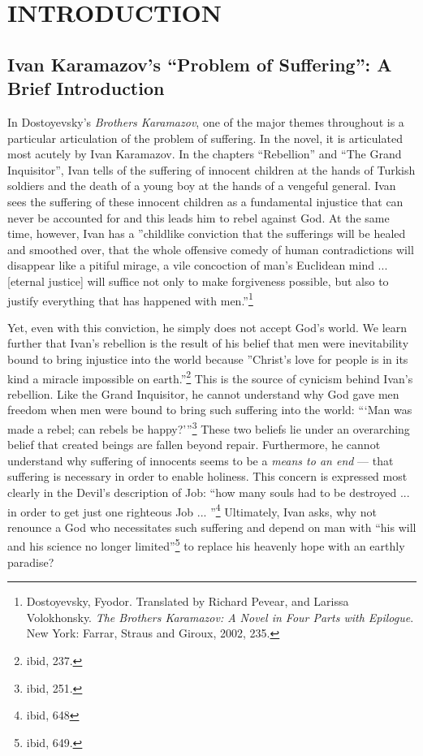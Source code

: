 \tableofcontents
\chapter{INTRODUCTION}

\pagestyle{myheadings}

\label{introduction}
\section{Ivan Karamazov's ``Problem of Suffering'': A Brief Introduction}
In Dostoyevsky's \emph{Brothers Karamazov}, one of the major themes throughout is a particular articulation of the problem of suffering. In the novel, it is articulated most acutely by Ivan Karamazov. In the chapters ``Rebellion'' and ``The Grand Inquisitor'', Ivan tells of the suffering of innocent children at the hands of Turkish soldiers and the death of a young boy at the hands of a vengeful general. Ivan sees the suffering of these innocent children as a fundamental injustice that can never be accounted for and this leads him to rebel against God. At the same time, however, Ivan has a ''childlike conviction that the sufferings will be healed and smoothed over, that the whole offensive comedy of human contradictions will disappear like a pitiful mirage, a vile concoction of man's Euclidean mind ... [eternal justice] will suffice not only to make forgiveness possible, but also to justify everything that has happened with men.''\footnote{Dostoyevsky, Fyodor. Translated by Richard Pevear, and Larissa Volokhonsky. \emph{The Brothers Karamazov: A Novel in Four Parts with Epilogue}. New York: Farrar, Straus and Giroux, 2002, 235.}

Yet, even with this conviction, he simply does not accept God's world. We learn further that Ivan's rebellion is the result of his belief that men were inevitability bound to bring injustice into the world because ''Christ's love for people is in its kind a miracle impossible on earth.''\footnote{ibid, 237.} This is the source of cynicism behind Ivan's rebellion. Like the Grand Inquisitor, he cannot understand why God gave men freedom when men were bound to bring such suffering into the world: ```Man was made a rebel; can rebels be happy?'''\footnote{ibid, 251.} These two beliefs lie under an overarching belief that created beings are fallen beyond repair. Furthermore, he cannot understand why suffering of innocents seems to be a \emph{means to an end} --- that suffering is necessary in order to enable holiness. This concern is expressed most clearly in the Devil's description of Job: ``how many souls had to be destroyed ... in order to get just one righteous Job ... ''\footnote{ibid, 648} Ultimately, Ivan asks, why not renounce a God who necessitates such suffering and depend on man with ``his will and his science no longer limited''\footnote{ibid, 649.} to replace his heavenly hope with an earthly paradise?

